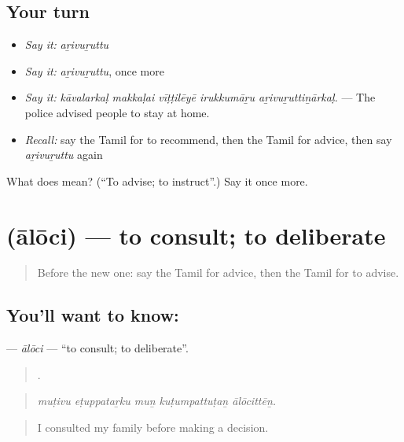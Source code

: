 \subsection*{Your turn}
\begin{itemize}
\raggedright
  \item \emph{Say it:} \emph{aṟivuṟuttu}
  \item \emph{Say it:} \emph{aṟivuṟuttu}, once more
  \item \emph{Say it:} \emph{kāvalarkaḷ makkaḷai vīṭṭilēyē irukkumāṟu aṟivuṟuttiṉārkaḷ.} — The police advised people to stay at home.
  \item \emph{Recall:} say the Tamil for to recommend, then the Tamil for advice, then say \emph{aṟivuṟuttu} again
\end{itemize}

\begin{tcolorbox}[breakable,colback=teal!4,colframe=teal!35!black,title={Before you move on}]
What does  mean? (\textquotedblleft{}To advise; to instruct\textquotedblright{}.) Say it once more.
\end{tcolorbox}
\section[\texorpdfstring{\ta{ஆலோசி} (ālōci)}{ஆலோசி (ālōci)}]{ (ālōci) — to consult; to deliberate}

\label{lesson:TA-C355-aloci}



\begin{quote}
Before the new one: say the Tamil for advice, then the Tamil for to advise.
\end{quote}

\subsection*{You'll want to know: }
\textbf{} — \emph{ālōci} — \textquotedblleft{}to consult; to deliberate\textquotedblright{}.

\begin{quote}
    .
\end{quote}

\begin{quote}
\emph{muṭivu eṭuppataṟku muṉ kuṭumpattuṭaṉ ālōcittēṉ.}
\end{quote}

\begin{quote}
I consulted my family before making a decision.
\end{quote}

